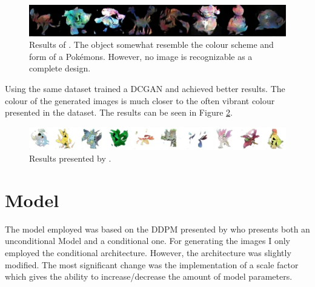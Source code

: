 \documentclass[12pt]{article}
\theoremstyle{plain}
\theoremstyle{definition}
\theoremstyle{remark}
\begin{document}
 \begin{figure}[h]
	\centering
	\includegraphics[width=1\linewidth]{src/Images/Kleiber_results}
	\caption[Results of \cite{Kleiber2020}]{Results of \cite{Kleiber2020}. The object somewhat resemble the colour scheme and form of a Pokémons. However, no image is recognizable as a complete design.}
	\label{fig:kleiberresults}
\end{figure}

Using the same dataset \cite{Chambel2022} trained a \ac{DCGAN} and achieved better results. The colour of the generated images is much closer to the often vibrant colour presented in the dataset. The results can be seen in Figure \ref{fig:chambelresults}.

\begin{figure}[h]
	\centering
	\includegraphics[width=1\linewidth]{src/Images/Chambel_results}
	\caption[Results presented by \cite{Chambel2022}]{Results presented by \cite{Chambel2022}.}
	\label{fig:chambelresults}
\end{figure}


\section{Model}
\label{sec:model}
The model employed was based on the \acf{DDPM} presented by \cite{Ho2020} who presents both an unconditional Model and a conditional one. For generating the images I only employed the conditional architecture. However, the architecture was slightly modified. The most significant change was the implementation of a scale factor which gives the ability to increase/decrease the amount of model parameters.
\end{document}
